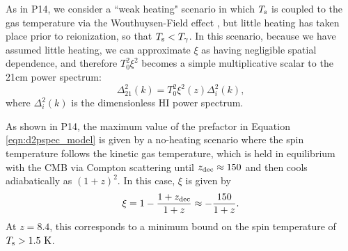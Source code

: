 \documentclass[twocolumn,numberedappendix]{emulateapj} \shorttitle{New Limits on the 21 cm Power Spectrum at $z=8.4$}
\newcommand{\Tspin}{T_{\rm s}}
\newcommand{\Tcmb}{T_\gamma}
\begin{document}
As in P14,
we consider a ``weak heating" scenario in which $\Tspin$ is coupled to the gas temperature via
the Wouthuysen-Field effect \citep{wouthuysen1952,field1958,hirata2006},
but little heating has taken place prior to reionization, so that $\Tspin<\Tcmb$.
In this scenario, 
because we have assumed little heating, we can approximate $\xi$ as having negligible spatial
dependence, and therefore $T_0^2\xi^2$ becomes a simple multiplicative scalar to the 
21cm power spectrum:
\begin{equation}\label{eqn:d2pspec_model}
    \Delta^2_{21}(k) = T_0^2\xi^2(z)\Delta_{i}^{2}(k),%
\end{equation}
where $\Delta_{i}^{2}(k)$ is the dimensionless HI power spectrum. 

As shown in P14, the maximum value of the
prefactor in Equation \eqref{eqn:d2pspec_model} is given by 
a no-heating scenario where the spin temperature follows the kinetic gas temperature,
which is held in equilibrium with the CMB via Compton scattering until $z_{\rm dec}\approx150$
\citep{furlanetto_et_al2006} and then cools adiabatically
as $(1+z)^2$.
In this case, $\xi$ is given by
\begin{equation}\label{eqn:maxxi}
\xi = 1 -\frac{1+z_{\rm dec}}{1+z} \approx -\frac{150}{1+z}.
\end{equation}
At $z=8.4$, this corresponds to a minimum bound on the spin temperature of $\Tspin>1.5~{\rm K}$.
\end{document}

